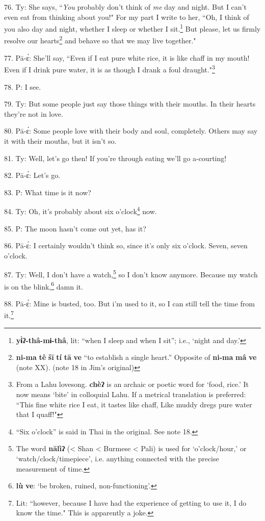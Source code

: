 76. Ty: She says, ``\textit{You} probably don't think of \textit{me}
day and night. But I can't even eat from thinking about you!" For my part
I write to her, ``Oh, I think of you also day and night, whether I sleep
or whether I sit.\footnote{\textbf{yɨ̀ʔ-thâ-mɨ-thâ}, lit: ``when I sleep and when I sit''; i.e., `night and day.'} But please, let us firmly resolve our hearts\footnote{\textbf{ni-ma} \textbf{tê} \textbf{šī} \textbf{tí} \textbf{tā} \textbf{ve} ``to establish a single heart.'' Opposite of \textbf{ni-ma} \textbf{mâ} \textbf{ve} (note XX). (note 18 in Jim's original)} and behave
so that we may live together."

77. Pā-ɛ́: She'll say, ``Even if I eat pure white rice, it is like chaff
in my mouth! Even if I drink pure water, it is as though I drank a foul draught."\footnote{From a Lahu lovesong. \textbf{chèʔ} is an archaic or poetic word for `food, rice.' It now means `bite' in colloquial Lahu. If a metrical translation is preferred: ``This fine white rice I eat, it tastes like chaff, Like muddy dregs pure water that I quaff!"}

78. P: I see.

79. Ty: But some people just say those things with their mouths. In their
hearts they're not in love.

80. Pā-ɛ́: Some people love with their body and soul, completely. Others may
say it with their mouths, but it isn't so.

81. Ty: Well, let's go then! If you're through eating we'll go a-courting!

82. Pā-ɛ́: Let's go.

83. P: What time is it now?

84. Ty: Oh, it's probably about\textit{ }six o'clock\footnote{``Six o'clock'' is said in Thai in the original. See note 18.} now.

85. P: The moon hasn't come out yet, has it?

86. Pā-ɛ́: I certainly wouldn't think so, since it's only six o'clock. Seven,
seven o'clock.

87. Ty: Well, I don't have a watch,\footnote{The word \textbf{nālìʔ} (< Shan < Burmese < Pali) is used for `o'clock/hour,' or `watch/clock/timepiece', i.e. anything connected with the precise measurement of time.} so I don't know anymore. Because my
watch is on the blink,\footnote{\textbf{lù} \textbf{ve}: `be broken, ruined, non-functioning'.} damn it.

88. Pā-ɛ́: Mine is busted, too. But i'm used to it, so I can still tell the
time from it.\footnote{Lit: ``however, because I have had the experience of getting to use it, I do know the time." This is apparently a joke.}

